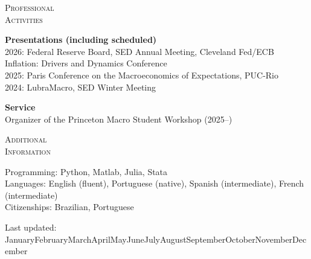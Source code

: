 \documentclass[11pt, letterpaper]{article}
\newlength{\seclabelwidth}
\newenvironment{cvsection}[1]{%
  \vspace{1.2em}%
  \noindent\begin{minipage}[t]{\seclabelwidth}%
    \raggedright\textsc{#1}%
  \end{minipage}%
  \hspace{0.8em}%
  \begin{minipage}[t]{\dimexpr\textwidth-\seclabelwidth-0.8em}%
}{%
  \end{minipage}\par%
}
\newcommand{\monthyear}{\ifcase\month\or January\or February\or March\or April\or May\or June\or July\or August\or September\or October\or November\or December\fi\space\the\year}
\begin{document}
\begin{cvsection}{Professional\\Activities}
  \textbf{Presentations (including scheduled)} \\
  2026: Federal Reserve Board, SED Annual Meeting, Cleveland Fed/ECB Inflation: Drivers and Dynamics Conference \\
  2025: Paris Conference on the Macroeconomics of Expectations, PUC-Rio \\
  2024: LubraMacro, SED Winter Meeting

  \vspace{0.5em}

  \textbf{Service} 
  \\ 
  Organizer of the Princeton Macro Student Workshop (2025--)
\end{cvsection}

\begin{cvsection}{Additional\\Information}
  Programming: Python, Matlab, Julia, Stata \\
  Languages: English (fluent), Portuguese (native), Spanish (intermediate), French (intermediate) \\
  Citizenships: Brazilian, Portuguese
\end{cvsection}

\vspace{5em}
\begin{raggedright}
  \hfill {\footnotesize Last updated: \monthyear}
\end{raggedright}
\end{document}
